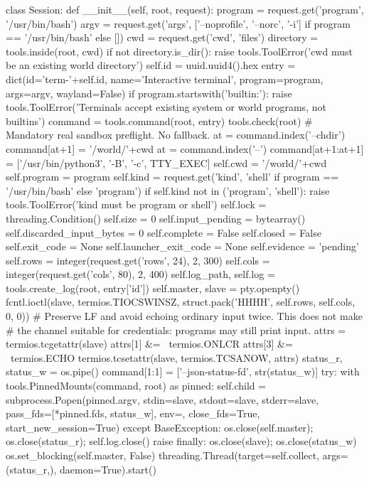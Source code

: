 class Session:
    def __init__(self, root, request):
        program = request.get('program', '/usr/bin/bash')
        argv = request.get('args', ['--noprofile', '--norc', '-i'] if program == '/usr/bin/bash' else [])
        cwd = request.get('cwd', 'files')
        directory = tools.inside(root, cwd)
        if not directory.is_dir():
            raise tools.ToolError('cwd must be an existing world directory')
        self.id = uuid.uuid4().hex
        entry = dict(id='term-'+self.id, name='Interactive terminal', program=program, args=argv, wayland=False)
        if program.startswith('builtin:'):
            raise tools.ToolError('Terminals accept existing system or world programs, not builtins')
        command = tools.command(root, entry)
        tools.check(root)  # Mandatory real sandbox preflight. No fallback.
        at = command.index('--chdir')
        command[at+1] = '/world/'+cwd
        at = command.index('--')
        command[at+1:at+1] = ['/usr/bin/python3', '-B', '-c', TTY_EXEC]
        self.cwd = '/world/'+cwd
        self.program = program
        self.kind = request.get('kind', 'shell' if program == '/usr/bin/bash' else 'program')
        if self.kind not in ('program', 'shell'):
            raise tools.ToolError('kind must be program or shell')
        self.lock = threading.Condition()
        self.size = 0
        self.input_pending = bytearray()
        self.discarded_input_bytes = 0
        self.complete = False
        self.closed = False
        self.exit_code = None
        self.launcher_exit_code = None
        self.evidence = 'pending'
        self.rows = integer(request.get('rows', 24), 2, 300)
        self.cols = integer(request.get('cols', 80), 2, 400)
        self.log_path, self.log = tools.create_log(root, entry['id'])
        self.master, slave = pty.openpty()
        fcntl.ioctl(slave, termios.TIOCSWINSZ, struct.pack('HHHH', self.rows, self.cols, 0, 0))
        # Preserve LF and avoid echoing ordinary input twice. This does not make
        # the channel suitable for credentials: programs may still print input.
        attrs = termios.tcgetattr(slave)
        attrs[1] &= ~termios.ONLCR
        attrs[3] &= ~termios.ECHO
        termios.tcsetattr(slave, termios.TCSANOW, attrs)
        status_r, status_w = os.pipe()
        command[1:1] = ['--json-status-fd', str(status_w)]
        try:
            with tools.PinnedMounts(command, root) as pinned:
                self.child = subprocess.Popen(pinned.argv, stdin=slave, stdout=slave, stderr=slave,
                    pass_fds=[*pinned.fds, status_w], env={}, close_fds=True, start_new_session=True)
        except BaseException:
            os.close(self.master); os.close(status_r); self.log.close()
            raise
        finally:
            os.close(slave); os.close(status_w)
        os.set_blocking(self.master, False)
        threading.Thread(target=self.collect, args=(status_r,), daemon=True).start()

